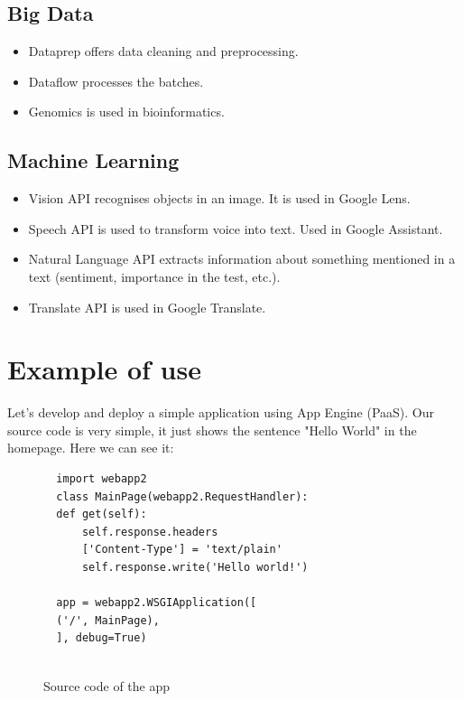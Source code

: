 \documentclass[12pt,english]{article}
\begin{document}
\subsection{Big Data}

\begin{itemize}
  \item Dataprep offers data cleaning and preprocessing.
  \item Dataflow processes the batches.
  \item Genomics is used in bioinformatics.
\end{itemize}

\subsection{Machine Learning}

\begin{itemize}
  \item Vision API recognises objects in an image. It is used in Google Lens.
  \item Speech API is used to transform voice into text. Used in Google Assistant.
  \item Natural Language API extracts information about something mentioned in a text (sentiment, importance in the test, etc.).
  \item Translate API is used in Google Translate.
\end{itemize}

\section{Example of use}

Let's develop and deploy a simple application using App Engine (PaaS). Our source code is very simple, it just shows the sentence "Hello World" in the homepage. Here we can see it:

\begin{figure}[H]
  \centering
  \begin{verbatim}
  import webapp2
  class MainPage(webapp2.RequestHandler):
  def get(self):
      self.response.headers
      ['Content-Type'] = 'text/plain'
      self.response.write('Hello world!')

  app = webapp2.WSGIApplication([
  ('/', MainPage),
  ], debug=True)


  \end{verbatim}
  \caption{Source code of the app}
\end{figure}
\end{document}
